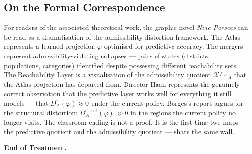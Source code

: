 \documentclass[11pt, letterpaper]{article}
\begin{document}
\subsection*{On the Formal Correspondence}

For readers of the associated theoretical work, the graphic novel \textit{Nine Parsecs} can be read
as a dramatisation of the admissibility distortion framework. The Atlas
represents a learned projection $\varphi$ optimised for predictive accuracy.
The mergers represent admissibility-violating collapses --- pairs of states
(districts, populations, categories) identified despite possessing different
reachability sets. The Reachability Layer is a visualisation of the admissibility
quotient $\mathcal{X}/{\sim_A}$ that the Atlas projection has departed from.
Director Haan represents the genuinely correct observation that the predictive
layer works well for everything it still models --- that
$D_A^{\pi}(\varphi) \approx 0$ under the current policy. Borges's report
argues for the structural distortion: $D_A^{\mathrm{struct}}(\varphi) \gg 0$
in the regions the current policy no longer visits. The classroom ending is
not a proof. It is the first time two maps --- the predictive quotient and the
admissibility quotient --- share the same wall.

\bigskip

\noindent\textbf{End of Treatment.}
\end{document}
